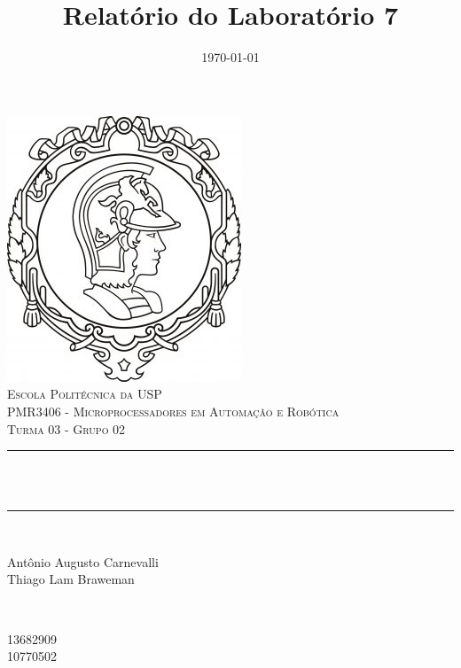 \documentclass{article}
\title{Relatório do Laboratório 7}								%
\author{} %
\date{\today}											%
\makeatletter
\let\thetitle\@title
\let\thedate\@date
\makeatother
\begin{document}

\begin{titlepage}
	\centering
    \vspace*{0.2 cm}
    \includegraphics[scale = 0.8]{logoPoli.jpg}\\[1.0 cm]	%
    \textsc{\LARGE \newline\newline Escola Politécnica da USP}\\[1.5 cm]	%
    \textsc{\Large PMR3406 - Microprocessadores em Automação e Robótica}\\[0.5 cm] %
    \textsc{\Large Turma 03 - Grupo 02}\\[0.5 cm]
	
	\rule{\linewidth}{0.2 mm} \\[0.4 cm]
	{ \huge \bfseries \thetitle}\\ 
	\rule{\linewidth}{0.2 mm} \\[1 cm]
	
	\begin{minipage}{0.5\textwidth}
		\begin{flushleft} \large

            Antônio Augusto Carnevalli\\
			Thiago Lam Braweman\\

			
			\end{flushleft}
	\end{minipage}~
	\begin{minipage}{0.5\textwidth}
            
		\begin{flushright} \large

            13682909\\
			10770502\\

		    
		    \end{flushright}
        
	\end{minipage}\\~
	\vfill
	\thedate
	
    
\end{titlepage}
\end{document}
